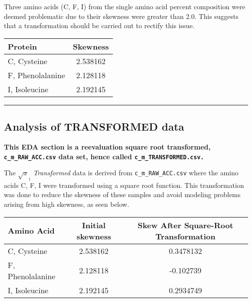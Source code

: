 \documentclass[]{article}
\newenvironment{Shaded}{\begin{snugshade}}{\end{snugshade}}
\newcommand{\CommentTok}[1]{\textcolor[rgb]{0.56,0.35,0.01}{\textit{#1}}}
\newcommand{\KeywordTok}[1]{\textcolor[rgb]{0.13,0.29,0.53}{\textbf{#1}}}
\newcommand{\NormalTok}[1]{#1}
\newcommand{\OperatorTok}[1]{\textcolor[rgb]{0.81,0.36,0.00}{\textbf{#1}}}
\newcommand{\StringTok}[1]{\textcolor[rgb]{0.31,0.60,0.02}{#1}}
\begin{document}
Three amino acids (C, F, I) from the single amino acid percent
composition were deemed problematic due to their skewness were greater
than 2.0. This suggests that a transformation should be carried out to
rectify this issue.

\begin{longtable}[]{@{}lc@{}}
\toprule
Protein & Skewness\tabularnewline
\midrule
\endhead
C, Cysteine & 2.538162\tabularnewline
F, Phenolalanine & 2.128118\tabularnewline
I, Isoleucine & 2.192145\tabularnewline
\bottomrule
\end{longtable}

\begin{center}\rule{0.5\linewidth}{0.5pt}\end{center}

\hypertarget{analysis-of-transformed-data}{%
\subsection{Analysis of TRANSFORMED
data}\label{analysis-of-transformed-data}}

\textbf{This EDA section is a reevaluation square root transformed,
\texttt{c\_m\_RAW\_ACC.csv} data set, hence called
\texttt{c\_m\_TRANSFORMED.csv.} }

The \(\sqrt x_i\) \emph{Transformed} data is derived from
\texttt{c\_m\_RAW\_ACC.csv} where the amino acids C, F, I were
transformed using a square root function. This transformation was done
to reduce the skewness of these samples and avoid modeling problems
arising from high skewness, as seen below.

\begin{longtable}[]{@{}lcc@{}}
\toprule
Amino Acid & Initial skewness & Skew After Square-Root
Transformation\tabularnewline
\midrule
\endhead
C, Cysteine & 2.538162 & 0.3478132\tabularnewline
F, Phenolalanine & 2.128118 & -0.102739\tabularnewline
I, Isoleucine & 2.192145 & 0.2934749\tabularnewline
\bottomrule
\end{longtable}

\begin{Shaded}
\end{Shaded}
\end{document}
